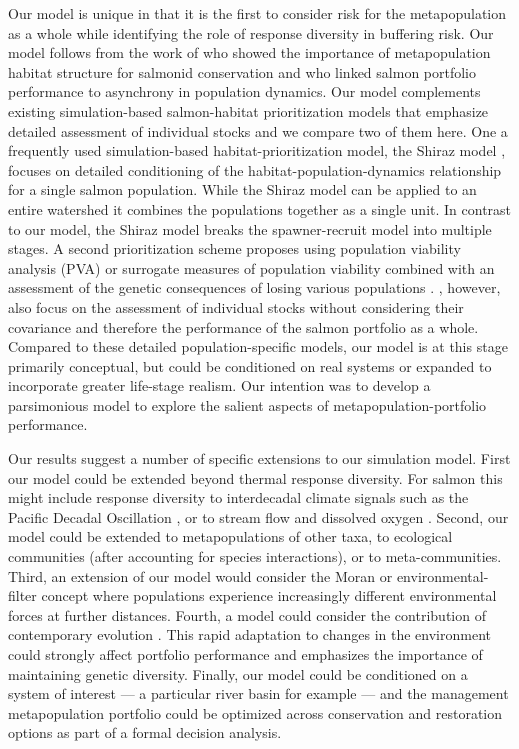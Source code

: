 Our model is unique in that it is the first to consider risk for the metapopulation as a whole while identifying the role of response diversity in buffering risk. Our model follows from the work of \citet{cooper1999} who showed the importance of metapopulation habitat structure for salmonid conservation and \citet{moore2010} who linked salmon portfolio performance to asynchrony in population dynamics. Our model complements existing simulation-based salmon-habitat prioritization models that emphasize detailed assessment of individual stocks and we compare two of them here. One a frequently used simulation-based habitat-prioritization model, the Shiraz model \citep{scheuerell2006}, focuses on detailed conditioning of the habitat-population-dynamics relationship for a single salmon population. While the Shiraz model can be applied to an entire watershed it combines the populations together as a single unit. In contrast to our model, the Shiraz model breaks the spawner-recruit model into multiple stages. A second prioritization scheme proposes using population viability analysis (PVA) or surrogate measures of population viability combined with an assessment of the genetic consequences of losing various populations \citep{allendorf1997}. \citet{allendorf1997}, however, also focus on the assessment of individual stocks without considering their covariance and therefore the performance of the salmon portfolio as a whole. Compared to these detailed population-specific models, our model is at this stage primarily conceptual, but could be conditioned on real systems or expanded to incorporate greater life-stage realism. Our intention was to develop a parsimonious model to explore the salient aspects of metapopulation-portfolio performance.

Our results suggest a number of specific extensions to our simulation model. First our model could be extended beyond thermal response diversity. For salmon this might include response diversity to interdecadal climate signals such as the Pacific Decadal Oscillation \citep{mantua2002}, or to stream flow and dissolved oxygen \citep{priede1988}. Second, our model could be extended to metapopulations of other taxa, to ecological communities (after accounting for species interactions), or to meta-communities. Third, an extension of our model would consider the Moran or environmental-filter concept \citep{schindler2008} where populations experience increasingly different environmental forces at further distances. Fourth, a model could consider the contribution of contemporary evolution \citep{stockwell2003}. This rapid adaptation to changes in the environment could strongly affect portfolio performance and emphasizes the importance of maintaining genetic diversity. Finally, our model could be conditioned on a system of interest --- a particular river basin for example --- and the management metapopulation portfolio could be optimized across conservation and restoration options as part of a formal decision analysis.

